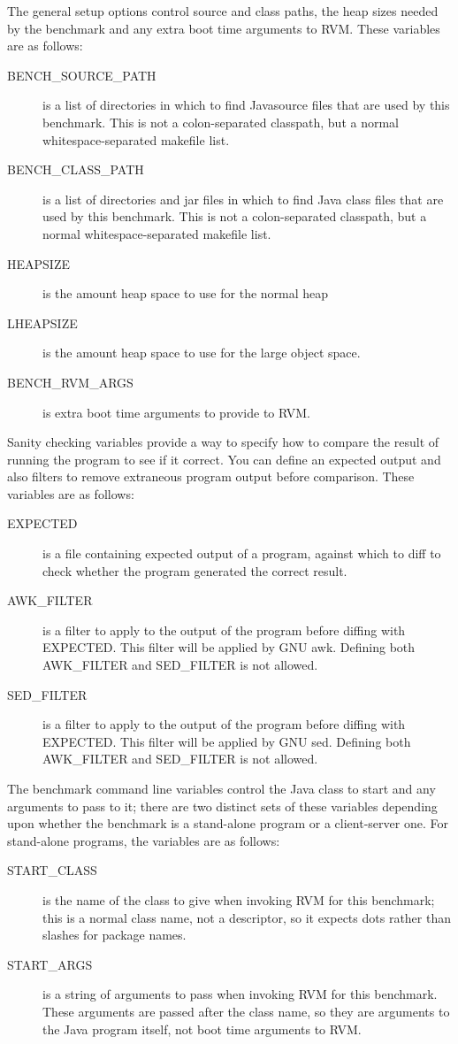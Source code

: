 \begin{description}
 The general setup options control source and class paths, the heap
sizes needed by the benchmark and any extra boot time arguments to
RVM.  These variables are as follows:
\begin{description}
\item[BENCH\_SOURCE\_PATH] is a list of directories in which to find
Java\trademark source files that are used by this benchmark.  This is not a
colon-separated classpath, but a normal whitespace-separated makefile
list.  
\item[BENCH\_CLASS\_PATH] is a list of directories and jar files in
which to find Java class files that are used by this benchmark.  This
is not a colon-separated classpath, but a normal whitespace-separated
makefile list.  
\item[HEAPSIZE] is the amount heap space to use for the normal heap
\item[LHEAPSIZE] is the amount heap space to use for the large object
space. 
\item[BENCH\_RVM\_ARGS] is extra boot time arguments to provide to
RVM. 
\end{description}

 Sanity checking variables provide a way to specify how to compare the
result of running the program to see if it correct.  You can define an
expected output and also filters to remove extraneous program output
before comparison.  These variables are as follows:
\begin{description}
\item[EXPECTED] is a file containing expected output of a program,
against which to diff to check whether the program generated the
correct result.
\item[AWK\_FILTER] is a filter to apply to the output of the program
before diffing with EXPECTED.  This filter will be applied by GNU
awk. Defining both AWK\_FILTER and SED\_FILTER is not
allowed. 
\item[SED\_FILTER] is a filter to apply to the output of the program
before diffing with EXPECTED.  This filter will be applied by GNU sed.
Defining both AWK\_FILTER and SED\_FILTER is not allowed. 
\end{description}

 The benchmark command line variables control the Java class to start
and any arguments to pass to it; there are two distinct sets of these
variables depending upon whether the benchmark is a stand-alone program
or a client-server one.  For stand-alone programs, the variables are as
follows: 
\begin{description}
\item[START\_CLASS] is the name of the class to give when invoking RVM
for this benchmark; this is a normal class name, not a descriptor, so
it expects dots rather than slashes for package names.
\item[START\_ARGS] is a string of arguments to pass when invoking RVM
for this benchmark.  These arguments are passed after the class name,
so they are arguments to the Java program itself, not boot time
arguments to RVM.
\end{description}


\end{description}
